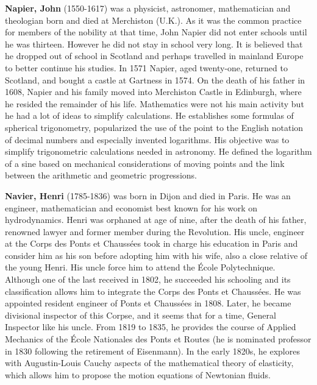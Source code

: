 \textbf{Napier, John} (1550-1617) was a physicist, astronomer, mathematician and theologian born and died at Merchiston (U.K.). As it was the common practice for members of the nobility at that time, John Napier did not enter schools until he was thirteen. However he did not stay in school very long. It is believed that he dropped out of school in Scotland and perhaps travelled in mainland Europe to better continue his studies. In 1571 Napier, aged twenty-one, returned to Scotland, and bought a castle at Gartness in 1574. On the death of his father in 1608, Napier and his family moved into Merchiston Castle in Edinburgh, where he resided the remainder of his life. Mathematics were not his main activity but he had a lot of ideas to simplify calculations. He establishes some formulas of spherical trigonometry, popularized the use of the point to the English notation of decimal numbers and especially invented logarithms. His objective was to simplify trigonometric calculations needed in astronomy. He defined the logarithm of a sine based on mechanical considerations of moving points and the link between the arithmetic and geometric progressions.

\textbf{Navier, Henri} (1785-1836) was born in Dijon and died in Paris. He was an engineer, mathematician and economist best known for his work on hydrodynamics. Henri was orphaned at age of nine, after the death of his father, renowned lawyer and former member during the Revolution. His uncle, engineer at the Corps des Ponts et Chaussées took in charge his education in Paris and consider him as his son before adopting him with his wife, also a close relative of the young Henri. His uncle force him to attend the École Polytechnique. Although one of the last received in 1802, he succeeded his schooling and its classification allows him to integrate the Corps des Ponts et Chaussées. He was appointed resident engineer of Ponts et Chaussées in 1808. Later, he became divisional inspector of this Corpse, and it seems that for a time, General Inspector like his uncle. From 1819 to 1835, he provides the course of Applied Mechanics of the École Nationales des Ponts et Routes (he is nominated professor in 1830 following the retirement of Eisenmann). In the early 1820s, he explores with Augustin-Louis Cauchy aspects of the mathematical theory of elasticity, which allows him to propose the motion equations of Newtonian fluids.

